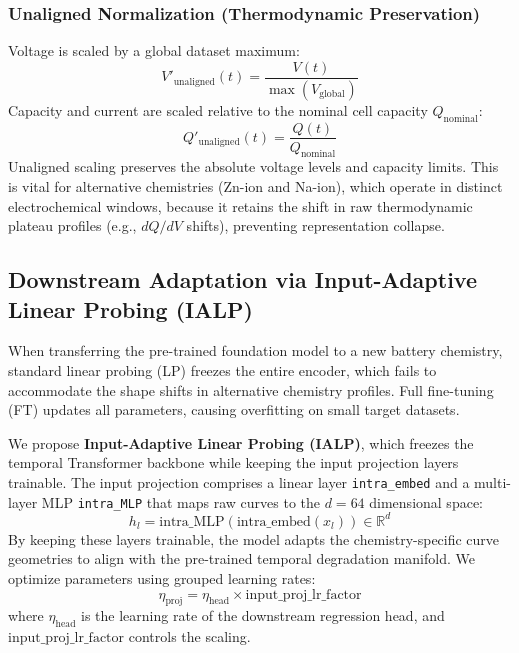 \documentclass[a4paper,fleqn]{cas-dc}
\begin{document}
\subsubsection{Unaligned Normalization (Thermodynamic Preservation)}
Voltage is scaled by a global dataset maximum:
\begin{equation}
    V'_{\text{unaligned}}(t) = \frac{V(t)}{\max(V_{\text{global}})}
\end{equation}
Capacity and current are scaled relative to the nominal cell capacity $Q_{\text{nominal}}$:
\begin{equation}
    Q'_{\text{unaligned}}(t) = \frac{Q(t)}{Q_{\text{nominal}}}
\end{equation}
Unaligned scaling preserves the absolute voltage levels and capacity limits. This is vital for alternative chemistries (Zn-ion and Na-ion), which operate in distinct electrochemical windows, because it retains the shift in raw thermodynamic plateau profiles (e.g., $dQ/dV$ shifts), preventing representation collapse.

\subsection{Downstream Adaptation via Input-Adaptive Linear Probing (IALP)}
When transferring the pre-trained foundation model to a new battery chemistry, standard linear probing (LP) freezes the entire encoder, which fails to accommodate the shape shifts in alternative chemistry profiles. Full fine-tuning (FT) updates all parameters, causing overfitting on small target datasets.

We propose \textbf{Input-Adaptive Linear Probing (IALP)}, which freezes the temporal Transformer backbone while keeping the input projection layers trainable. The input projection comprises a linear layer \texttt{intra\_embed} and a multi-layer MLP \texttt{intra\_MLP} that maps raw curves to the $d=64$ dimensional space:
\begin{equation}
    h_l = \text{intra\_MLP}(\text{intra\_embed}(x_l)) \in \mathbb{R}^d
\end{equation}
By keeping these layers trainable, the model adapts the chemistry-specific curve geometries to align with the pre-trained temporal degradation manifold. We optimize parameters using grouped learning rates:
\begin{equation}
    \eta_{\text{proj}} = \eta_{\text{head}} \times \text{input\_proj\_lr\_factor}
\end{equation}
where $\eta_{\text{head}}$ is the learning rate of the downstream regression head, and $\text{input\_proj\_lr\_factor}$ controls the scaling.
\end{document}
